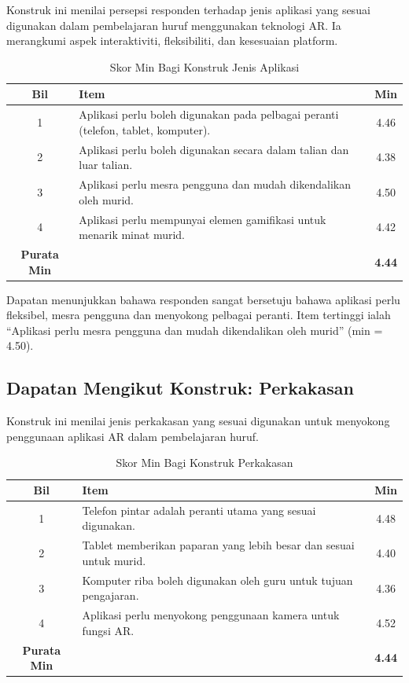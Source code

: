{Konstruk ini menilai persepsi responden terhadap jenis aplikasi yang sesuai digunakan dalam pembelajaran huruf menggunakan teknologi AR. Ia merangkumi aspek interaktiviti, fleksibiliti, dan kesesuaian platform.

\begin{table}[H]
\centering
\caption{Skor Min Bagi Konstruk Jenis Aplikasi}
\label{jadual:jenisAplikasi}
\begin{tabular}{|c|p{9cm}|c|}
\hline
\textbf{Bil} & \textbf{Item} & \textbf{Min} \\
\hline
1 & Aplikasi perlu boleh digunakan pada pelbagai peranti (telefon, tablet, komputer). & 4.46 \\
\hline
2 & Aplikasi perlu boleh digunakan secara dalam talian dan luar talian. & 4.38 \\
\hline
3 & Aplikasi perlu mesra pengguna dan mudah dikendalikan oleh murid. & 4.50 \\
\hline
4 & Aplikasi perlu mempunyai elemen gamifikasi untuk menarik minat murid. & 4.42 \\
\hline
\textbf{Purata Min} & & \textbf{4.44} \\
\hline
\end{tabular}
\end{table}

Dapatan menunjukkan bahawa responden sangat bersetuju bahawa aplikasi perlu fleksibel, mesra pengguna dan menyokong pelbagai peranti. Item tertinggi ialah “Aplikasi perlu mesra pengguna dan mudah dikendalikan oleh murid” (min = 4.50).
\subsection{Dapatan Mengikut Konstruk: Perkakasan}

Konstruk ini menilai jenis perkakasan yang sesuai digunakan untuk menyokong penggunaan aplikasi AR dalam pembelajaran huruf.

\begin{table}[H]
\centering
\caption{Skor Min Bagi Konstruk Perkakasan}
\label{jadual:perkakasan}
\begin{tabular}{|c|p{9cm}|c|}
\hline
\textbf{Bil} & \textbf{Item} & \textbf{Min} \\
\hline
1 & Telefon pintar adalah peranti utama yang sesuai digunakan. & 4.48 \\
\hline
2 & Tablet memberikan paparan yang lebih besar dan sesuai untuk murid. & 4.40 \\
\hline
3 & Komputer riba boleh digunakan oleh guru untuk tujuan pengajaran. & 4.36 \\
\hline
4 & Aplikasi perlu menyokong penggunaan kamera untuk fungsi AR. & 4.52 \\
\hline
\textbf{Purata Min} & & \textbf{4.44} \\
\hline
\end{tabular}
\end{table}

}
